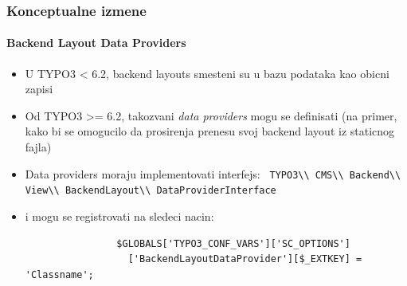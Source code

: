 
\begin{frame}[fragile]
	\frametitle{Konceptualne izmene}
	\framesubtitle{Backend Layout Data Providers}

	\begin{itemize}
		\item U TYPO3 < 6.2, backend layouts smesteni su u bazu podataka kao obicni zapisi
		\item Od TYPO3 >= 6.2, takozvani \emph{data providers} mogu se definisati\newline
			\small(na primer, kako bi se omogucilo da prosirenja prenesu svoj backend layout iz staticnog fajla)\normalsize

		\item Data providers moraju implementovati interfejs:\newline
			\smaller\texttt{
				TYPO3\textbackslash\textbackslash
				CMS\textbackslash\textbackslash
				Backend\textbackslash\textbackslash
				View\textbackslash\textbackslash
				BackendLayout\textbackslash\textbackslash
				DataProviderInterface}\normalsize

		\item i mogu se registrovati na sledeci nacin:

			\begin{lstlisting}
				$GLOBALS['TYPO3_CONF_VARS']['SC_OPTIONS']
				  ['BackendLayoutDataProvider'][$_EXTKEY] = 'Classname';
			\end{lstlisting}


	\end{itemize}

\end{frame}



